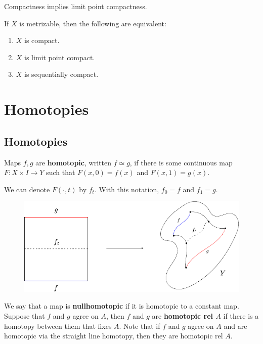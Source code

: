 \documentclass[twoside,10pt]{report}
\begin{document}
\begin{prop}
Compactness implies limit point compactness.
\end{prop}

\begin{thrm}[]
If $X$ is metrizable, then the following are equivalent:
\begin{enumerate}
	\item $X$ is compact.
	\item $X$ is limit point compact.
	\item $X$ is sequentially compact.
\end{enumerate}
\end{thrm}


\chapter{Homotopies}


\section{Homotopies}

\begin{defn}[]
	Maps $f,g$ are \textbf{homotopic}, written $f \simeq g$, if there is some continuous map $F:X\times I\to Y$ such that $F(x,0)=f(x)$ and $F(x,1)=g(x)$.
\end{defn}
We can denote $F(\cdot,t)$ by $f_{t}$. With this notation, $f_0=f$ and $f_1=g$.

\begin{figure}[H]
	\centering
	\includegraphics[scale=1]{fig/homotopy.pdf}
\end{figure}

We say that a map is \textbf{nullhomotopic} if it is homotopic to a constant map. Suppose that $f$ and $g$ agree on $A$, then $f$ and $g$ are \textbf{homotopic rel $A$} if there is a homotopy between them that fixes $A$. Note that if $f$ and $g$ agree on $A$ and are homotopic via the straight line homotopy, then they are homotopic rel $A$.
\end{document}
